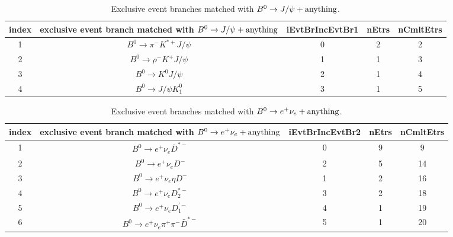 \documentclass[landscape]{article}
\begin{document}
\begin{table}[htbp!]
\caption{Exclusive event branches matched with $ B^{0} \rightarrow J/\psi + \rm{anything} $.}
\small
\centering
\begin{tabular}{|c|c|c|c|c|}
\hline
index & exclusive event branch matched with $ B^{0} \rightarrow J/\psi + \rm{anything} $ & iEvtBrIncEvtBr1 & nEtrs & nCmltEtrs \\
\hline
1 & $ B^{0} \rightarrow \pi^{-} K^{*+} J/\psi $ & 0 & 2 & 2 \\
\hline
2 & $ B^{0} \rightarrow \rho^{-} K^{+} J/\psi $ & 1 & 1 & 3 \\
\hline
3 & $ B^{0} \rightarrow K^{0} J/\psi $ & 2 & 1 & 4 \\
\hline
4 & $ B^{0} \rightarrow J/\psi K_1^{0} $ & 3 & 1 & 5 \\
\hline
\end{tabular}
\end{table}

\clearpage

\begin{table}[htbp!]
\caption{Exclusive event branches matched with $ B^{0} \rightarrow e^{+} \nu_{e} + \rm{anything} $.}
\small
\centering
\begin{tabular}{|c|c|c|c|c|}
\hline
index & exclusive event branch matched with $ B^{0} \rightarrow e^{+} \nu_{e} + \rm{anything} $ & iEvtBrIncEvtBr2 & nEtrs & nCmltEtrs \\
\hline
1 & $ B^{0} \rightarrow e^{+} \nu_{e} \bar{D}^{*-} $ & 0 & 9 & 9 \\
\hline
2 & $ B^{0} \rightarrow e^{+} \nu_{e} D^{-} $ & 2 & 5 & 14 \\
\hline
3 & $ B^{0} \rightarrow e^{+} \nu_{e} \eta D^{-} $ & 1 & 2 & 16 \\
\hline
4 & $ B^{0} \rightarrow e^{+} \nu_{e} D_{2}^{*-} $ & 3 & 2 & 18 \\
\hline
5 & $ B^{0} \rightarrow e^{+} \nu_{e} D_{1}^{\prime-} $ & 4 & 1 & 19 \\
\hline
6 & $ B^{0} \rightarrow e^{+} \nu_{e} \pi^{+} \pi^{-} \bar{D}^{*-} $ & 5 & 1 & 20 \\
\hline
\end{tabular}
\end{table}
\end{document}
